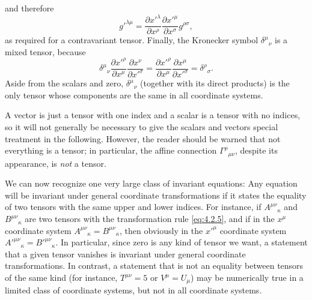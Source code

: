 and therefore
\begin{equation}
  g'^{\lambda\mu}
  =
  \frac{\partial x'^\lambda}{\partial x^\rho}
  \frac{\partial x'^\mu}{\partial x^\sigma}g^{\rho\sigma},
  \tag{4.2.7}\label{eq:4.2.7}
\end{equation}
as required for a contravariant tensor. Finally, the Kronecker symbol
\(\delta^\mu{}_\nu\) is a mixed tensor, because
\begin{equation}
  \delta^\mu{}_\nu
  \frac{\partial x'^\rho}{\partial x^\mu}
  \frac{\partial x^\nu}{\partial x'^\sigma}
  =
  \frac{\partial x'^\rho}{\partial x^\mu}
  \frac{\partial x^\mu}{\partial x'^\sigma}
  =
  \delta^\rho{}_\sigma .
  \tag{4.2.8}\label{eq:4.2.8}
\end{equation}
Aside from the scalars and zero, \(\delta^\mu{}_\nu\) (together with its
direct products) is the only tensor whose components are the same in all
coordinate systems.

A vector is just a tensor with one index and a scalar is a tensor with no
indices, so it will not generally be necessary to give the scalars and
vectors special treatment in the following. However, the reader should be
warned that not everything is a tensor; in particular, the affine connection
\(\Gamma^\rho{}_{\mu\nu}\), despite its appearance, is \textit{not} a tensor.

We can now recognize one very large class of invariant equations: Any
equation will be invariant under general coordinate transformations if it
states the equality of two tensors with the same upper and lower indices. For
instance, if \(A^{\mu\nu}{}_{\kappa}\) and
\(B^{\mu\nu}{}_{\kappa}\) are two tensors with the transformation rule
\eqref{eq:4.2.5}, and if in the \(x^\mu\) coordinate system
\(A^{\mu\nu}{}_{\kappa}=B^{\mu\nu}{}_{\kappa}\), then obviously in the
\(x'^\mu\) coordinate system
\(A'^{\mu\nu}{}_{\kappa}=B'^{\mu\nu}{}_{\kappa}\). In particular, since
zero is any kind of tensor we want, a statement that a given tensor vanishes
is invariant under general coordinate transformations. In contrast, a
statement that is not an equality between tensors of the same kind (for
instance, \(T^{\mu\nu}=5\) or \(V^\mu=U_\mu\)) may be numerically true in a
limited class of coordinate systems, but not in all coordinate systems.

